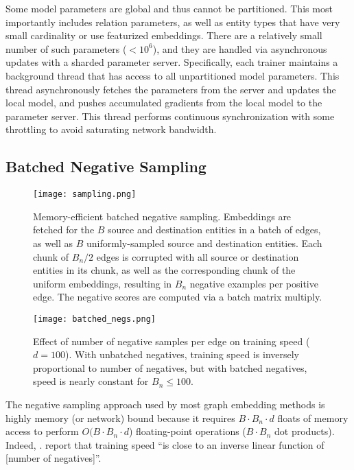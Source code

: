 \documentclass{article}
\begin{document}
Some model parameters are global and thus cannot be partitioned. This most importantly includes relation parameters, as well as entity types that have very small cardinality or use featurized embeddings. There are a relatively small number of such parameters ($<10^6$), and they are handled via asynchronous updates with a sharded parameter server. Specifically, each trainer maintains a background thread that has access to all unpartitioned model parameters. This thread asynchronously fetches the parameters from the server and updates the local model, and pushes accumulated gradients from the local model to the parameter server. This thread performs continuous synchronization with some throttling to avoid saturating network bandwidth.

\subsection{Batched Negative Sampling}

\begin{figure*}[t]
\centering
\texttt{[image: sampling.png]}
\vspace{-5mm}

\caption{Memory-efficient batched negative sampling. Embeddings are fetched for the $B$ source and destination entities in a batch of edges, as well as $B$ uniformly-sampled source and destination entities. Each chunk of $B_n/2$ edges is corrupted with all source or destination entities in its chunk, as well as the corresponding chunk of the uniform embeddings, resulting in $B_n$ negative examples per positive edge. The negative scores are computed via a batch matrix multiply.}
\label{fig:sampling}
\end{figure*}

\label{section:neg_sampling}

\begin{figure}[h]
\centering
\texttt{[image: batched\_negs.png]}
\caption{Effect of number of negative samples per edge on training speed ($d=100$). With unbatched negatives, training speed is inversely proportional to number of negatives, but with batched negatives, speed is nearly constant for $B_n \leq 100$.}
\label{fig:batched_negs}
\end{figure}

The negative sampling approach used by most graph embedding methods is highly memory (or network) bound because it requires $B \cdot B_n \cdot d$ floats of memory access to perform $O(B \cdot B_n \cdot d$) floating-point operations ($B \cdot B_n$ dot products). Indeed, \citeauthor{wu2017starspace}. report that training speed ``is close to an inverse linear function of [number of negatives]''.
\end{document}
